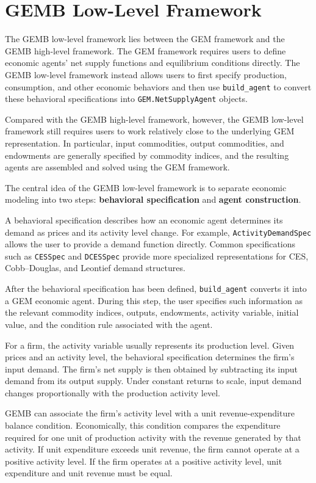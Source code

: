 \documentclass[
  letterpaper,
  DIV=11,
  numbers=noendperiod]{scrreprt}
\begin{document}
\section{GEMB Low-Level Framework}\label{gemb-low-level-framework}

The GEMB low-level framework lies between the GEM framework and the GEMB
high-level framework. The GEM framework requires users to define
economic agents' net supply functions and equilibrium conditions
directly. The GEMB low-level framework instead allows users to first
specify production, consumption, and other economic behaviors and then
use \texttt{build\_agent} to convert these behavioral specifications
into \texttt{GEM.NetSupplyAgent} objects.

Compared with the GEMB high-level framework, however, the GEMB low-level
framework still requires users to work relatively close to the
underlying GEM representation. In particular, input commodities, output
commodities, and endowments are generally specified by commodity
indices, and the resulting agents are assembled and solved using the GEM
framework.

The central idea of the GEMB low-level framework is to separate economic
modeling into two steps: \textbf{behavioral specification} and
\textbf{agent construction}.

A behavioral specification describes how an economic agent determines
its demand as prices and its activity level change. For example,
\texttt{ActivityDemandSpec} allows the user to provide a demand function
directly. Common specifications such as \texttt{CESSpec} and
\texttt{DCESSpec} provide more specialized representations for CES,
Cobb--Douglas, and Leontief demand structures.

After the behavioral specification has been defined,
\texttt{build\_agent} converts it into a GEM economic agent. During this
step, the user specifies such information as the relevant commodity
indices, outputs, endowments, activity variable, initial value, and the
condition rule associated with the agent.

For a firm, the activity variable usually represents its production
level. Given prices and an activity level, the behavioral specification
determines the firm's input demand. The firm's net supply is then
obtained by subtracting its input demand from its output supply. Under
constant returns to scale, input demand changes proportionally with the
production activity level.

GEMB can associate the firm's activity level with a unit
revenue-expenditure balance condition. Economically, this condition
compares the expenditure required for one unit of production activity
with the revenue generated by that activity. If unit expenditure exceeds
unit revenue, the firm cannot operate at a positive activity level. If
the firm operates at a positive activity level, unit expenditure and
unit revenue must be equal.
\end{document}
